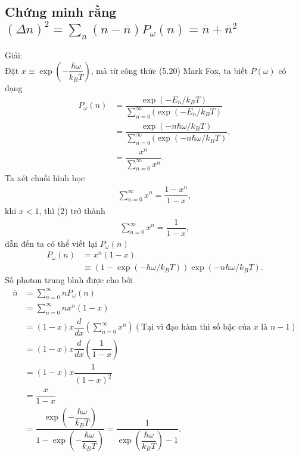 \documentclass{article}
\newcommand{\dps}{\displaystyle}
\newcommand{\f}[2]{\dfrac{#1}{#2}}
\begin{document}
\subsection*{Chứng minh rằng $(\Delta n)^2 = \dps\sum_{n} (n - \overline{n}) P_{\omega}(n) = \overline{n} + \overline{n}^2$}
Giải: \\
Đặt $x \equiv \exp(-\f{\hbar \omega}{k_B T})$, mà từ công thức (5.20) Mark Fox, ta biết $P(\omega)$ có dạng
\begin{align*}
	P_{\omega}(n)
	 & = \f{\exp(-E_{n} / k_B T)}{\sum_{n = 0}^{\infty}(\exp(-E_{n} / k_B T)}                    \\
	 & = \f{\exp(-n \hbar \omega / k_B T)}{\sum_{n = 0}^{\infty}(\exp(-n \hbar \omega / k_B T)}, \\
	 & = \f{x^{n}}{\sum_{n = 0}^{\infty} x^{n}}. \tag{1}
\end{align*}
Ta xét chuỗi hình học
\begin{align*}
	\sum_{n = 0}^{\infty} x^{n} = \f{1 - x^n}{1 - x} \tag{2},
\end{align*}
khi $x<1$, thì (2) trở thành
\begin{align*}
	\sum_{n = 0}^{\infty} x^{n} = \f{1}{1 - x}, \tag{3}
\end{align*}
dẫn đến ta có thể viết lại $P_{\omega}(n)$
\begin{align*}
	P_{\omega}(n)
	 & = x^{n} (1-x)                                                                               \\
	 & \equiv \left( 1 - \exp(-\hbar \omega / k_B T) \right) \exp(-n\hbar \omega / k_B T). \tag{4}
\end{align*}
Số photon trung bình được cho bởi
\begin{align*}
	\overline{n}
	 & = \sum_{n = 0}^{\infty} n P_{\omega}(n)                                                                                       \\
	 & = \sum_{n = 0}^{\infty} n x^{n} (1-x)                                                                                         \\
	 & = (1 - x) x \f{d}{dx} \left( \sum_{n = 0}^{\infty} x^{n} \right) (\text{Tại vì đạo hàm thì số bậc của $x$ là $n - 1$})        \\
	 & = (1 - x) x \f{d}{dx} \left(\f{1}{1 - x}\right)                                                                               \\
	 & = (1 - x) x \f{1}{(1 - x)^2}                                                                                                  \\
	 & = \f{x}{1 - x}                                                                                                                \\
	 & = \f{\exp(-\f{\hbar \omega}{k_B T})}{1 - \exp(-\f{\hbar \omega}{k_B T})} = \f{1}{\exp(\f{\hbar \omega}{k_B T}) - 1} . \tag{5}
\end{align*}
\end{document}
